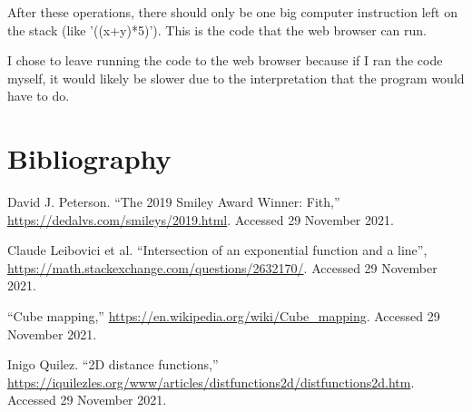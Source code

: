 After these operations, there should only be one big computer instruction left on the stack (like '((x+y)*5)').  This is the code that the web browser can run.

I chose to leave running the code to the web browser because if I ran the code myself, it would likely be slower due to the interpretation that the program would have to do.

\section*{Bibliography}

David J. Peterson.  ``The 2019 Smiley Award Winner: Fith,'' \url{https://dedalvs.com/smileys/2019.html}.  Accessed 29 November 2021.

Claude Leibovici et al.  ``Intersection of an exponential function and a line'', \url{https://math.stackexchange.com/questions/2632170/}.  Accessed 29 November 2021.

``Cube mapping,'' \url{https://en.wikipedia.org/wiki/Cube_mapping}.  Accessed 29 November 2021.

Inigo Quilez.  ``2D distance functions,'' \url{https://iquilezles.org/www/articles/distfunctions2d/distfunctions2d.htm}.  Accessed 29 November 2021.


